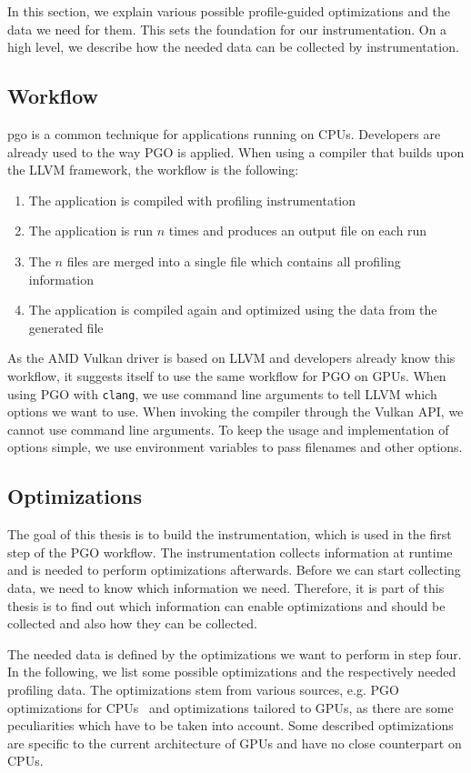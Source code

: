 \clearpage
{}
In this section, we explain various possible profile-guided optimizations and the data we need for them.
This sets the foundation for our instrumentation. On a high level, we describe how the needed data can be collected by instrumentation.

\subsection{Workflow}
\label{sub:workflow}
\Gls{pgo} is a common technique for applications running on CPUs.
Developers are already used to the way PGO is applied.
When using a compiler that builds upon the LLVM framework, the workflow is the following:
\begin{enumerate}
	\item The application is compiled with profiling instrumentation
	\item The application is run $n$ times and produces an output file on each run
	\item The $n$ files are merged into a single file which contains all profiling information
	\item The application is compiled again and optimized using the data from the generated file
\end{enumerate}
As the AMD Vulkan driver is based on LLVM and developers already know this workflow, it suggests itself to use the same workflow for PGO on GPUs.
When using PGO with \texttt{clang}, we use command line arguments to tell LLVM which options we want to use. When invoking the compiler through the Vulkan API, we cannot use command line arguments.
To keep the usage and implementation of options simple, we use environment variables to pass filenames and other options.

\subsection{Optimizations}
\label{sub:optimizations}
The goal of this thesis is to build the instrumentation, which is used in the first step of the PGO workflow. The instrumentation collects information at runtime and is needed to perform optimizations afterwards. Before we can start collecting data, we need to know which information we need. Therefore, it is part of this thesis is to find out which information can enable optimizations and should be collected and also how they can be collected.

The needed data is defined by the optimizations we want to perform in step four. In the following, we list some possible optimizations and the respectively needed profiling data.
The optimizations stem from various sources, e.g. PGO optimizations for CPUs~\cite{MicrosoftPgo} and optimizations tailored to GPUs, as there are some peculiarities which have to be taken into account.
Some described optimizations are specific to the current architecture of GPUs and have no close counterpart on CPUs.


